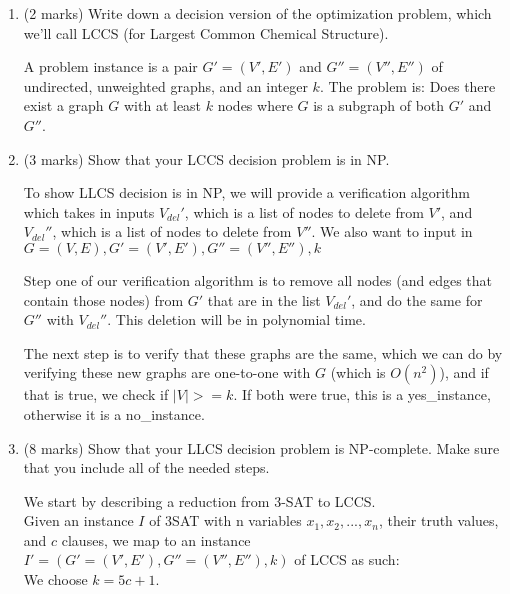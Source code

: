 \documentclass[11pt]{article}
\begin{document}
\begin{enumerate}
\item (2 marks)
  Write down a decision version of the optimization problem, which we'll call LCCS
  (for Largest Common Chemical Structure).
  
\begin{soln}
A problem instance is a pair $G' = (V',E')$ and $G'' = (V'',E'')$ of undirected, unweighted graphs, and an integer $k$. The problem is: Does there exist a graph $G$ with at least $k$ nodes where $G$ is a subgraph of both $G'$ and $G''$.
\end{soln}


\item (3 marks)
Show that your LCCS decision problem is in NP.

\begin{soln}
To show LLCS decision is in NP, we will provide a verification algorithm which takes in inputs $V_{del}'$, which is a list of nodes to delete from $V'$, and $V_{del}''$, which is a list of nodes to delete from $V''$. We also want to input in $G = (V,E), G' = (V',E'), G'' = (V'',E''), k$

Step one of our verification algorithm is to remove all nodes (and edges that contain those nodes) from $G'$ that are in the list $V_{del}'$, and do the same for $G''$ with $V_{del}''$. This deletion will be in polynomial time. 

The next step is to verify that these graphs are the same, which we can do by verifying these new graphs are one-to-one with $G$ (which is $O(n^2)$), and if that is true, we check if $|V| >= k$. If both were true, this is a yes\_instance, otherwise it is a no\_instance.

\end{soln}

\newpage

\item (8 marks)
Show that your LLCS decision problem is NP-complete. Make sure that you include all of the needed steps.

\begin{soln}
We start by describing a reduction from 3-SAT to LCCS. \\

Given an instance $I$ of 3SAT with n variables $x_1, x_2, ..., x_n$, their truth values, and $c$ clauses, we map to an instance $I' = (G'=(V', E'), G''=(V'', E''), k)$ of LCCS as such: \\

We choose $k = 5c+1$. \\


\end{soln}
\end{enumerate}
\end{document}
